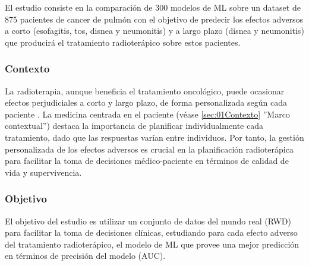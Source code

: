 El estudio consiste en la comparación de 300 modelos de ML sobre un dataset de 875 pacientes de cancer de pulmón con el objetivo de predecir los efectos adversos a corto (esofagitis, tos, disnea y neumonitis) y a largo plazo (disnea y neumonitis) que producirá el tratamiento radioterápico sobre estos pacientes. 

\subsubsection{Contexto}


La radioterapia, aunque beneficia el tratamiento oncológico, puede ocasionar efectos perjudiciales a corto y largo plazo, de forma personalizada según cada paciente \parencite{nunez2019comparison, nunez2023benchmarking}. La medicina centrada en el paciente (véase \ref{sec:01Contexto} ''Marco contextual'') destaca la importancia de planificar individualmente cada tratamiento, dado que las respuestas varían entre individuos. Por tanto, la gestión personalizada de los efectos adversos es crucial en la planificación radioterápica para facilitar la toma de decisiones médico-paciente en términos de calidad de vida y supervivencia.

\subsubsection{Objetivo}

El objetivo del estudio es utilizar un conjunto de datos del mundo real (RWD) para facilitar la toma de decisiones clínicas, estudiando para cada efecto adverso del tratamiento radioterápico, el modelo de ML que provee una mejor predicción en términos de precisión del modelo (AUC).

